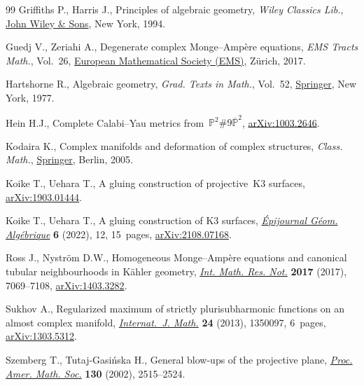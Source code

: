 \begin{thebibliography}{99}
Griffiths P., Harris J., Principles of algebraic geometry, \textit{Wiley Classics Lib.},
 \href{https://doi.org/10.1002/9781118032527}{John Wiley \& Sons}, New York,
 1994.

Guedj V., Zeriahi A., Degenerate complex {M}onge--{A}mp\`ere equations,
 \textit{EMS Tracts Math.}, Vol.~26,
 \href{https://doi.org/10.4171/167}{European Mathematical Society (EMS)},
 Z\"urich, 2017.

Hartshorne R., Algebraic geometry, \textit{Grad. Texts in Math.}, Vol.~52,
 \href{https://doi.org/10.1007/978-1-4757-3849-0}{Springer}, New York, 1977.

Hein H.J., Complete Calabi--Yau metrics
 from~$\mathbb{P}^2\#9\overline{\mathbb{P}}^2$,
 \href{http://arxiv.org/abs/1003.2646}{arXiv:1003.2646}.

Kodaira K., Complex manifolds and deformation of complex structures, \textit{Class.
 Math.}, \href{https://doi.org/10.1007/b138372}{Springer}, Berlin, 2005.

Koike T., Uehara T., A gluing construction of projective~{K}3 surfaces,
 \href{http://arxiv.org/abs/1903.01444}{arXiv:1903.01444}.

Koike T., Uehara T., A gluing construction of {K}3 surfaces,
 \href{https://doi.org/10.46298/epiga.2022.volume6.8504}{\textit{\'Epijournal
 G\'eom. Alg\'ebrique}} \textbf{6} (2022), 12, 15~pages,
 \href{http://arxiv.org/abs/2108.07168}{arXiv:2108.07168}.

Ross J., Nystr\"om D.W., Homogeneous {M}onge--{A}mp\`ere equations and
 canonical tubular neighbourhoods in {K}\"ahler geometry,
 \href{https://doi.org/10.1093/imrn/rnw200}{\textit{Int. Math. Res. Not.}}
 \textbf{2017} (2017), 7069--7108,
 \href{http://arxiv.org/abs/1403.3282}{arXiv:1403.3282}.

Sukhov A., Regularized maximum of strictly plurisubharmonic functions on an
 almost complex manifold,
 \href{https://doi.org/10.1142/S0129167X13500973}{\textit{Internat.~J. Math.}}
 \textbf{24} (2013), 1350097, 6~pages,
 \href{http://arxiv.org/abs/1303.5312}{arXiv:1303.5312}.

Szemberg T., Tutaj-Gasi\'nska H., General blow-ups of the projective plane,
 \href{https://doi.org/10.1090/S0002-9939-02-06488-2}{\textit{Proc. Amer.
 Math. Soc.}} \textbf{130} (2002), 2515--2524.


\end{thebibliography}
